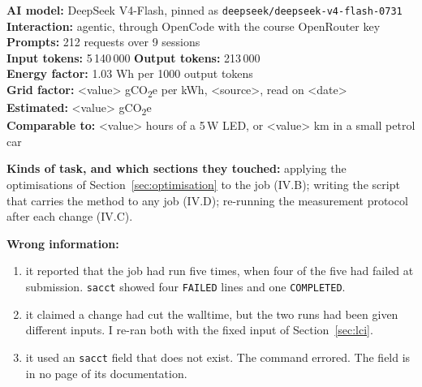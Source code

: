 \documentclass[conference,a4paper]{IEEEtran}
\begin{document}
\medskip
\noindent\textbf{AI model:} DeepSeek V4-Flash, pinned as
\texttt{deepseek/deepseek-v4-flash-0731} \\
\textbf{Interaction:} agentic, through OpenCode with the course OpenRouter key \\
\textbf{Prompts:} 212 requests over 9 sessions \\
\textbf{Input tokens:} 5\,140\,000 \quad \textbf{Output tokens:} 213\,000 \\
\textbf{Energy factor:} 1.03 Wh per 1000 output tokens \\
\textbf{Grid factor:} <value> gCO\textsubscript{2}e per kWh, <source>, read on
<date> \\
\textbf{Estimated:} <value> gCO\textsubscript{2}e \\
\textbf{Comparable to:} <value> hours of a 5\,W LED, or <value> km in a small
petrol car

\textbf{Kinds of task, and which sections they touched:} applying the
optimisations of Section~\ref{sec:optimisation} to the job (IV.B); writing the
script that carries the method to any job (IV.D); re-running the measurement
protocol after each change (IV.C).

\textbf{Wrong information:}
\begin{enumerate}
\item it reported that the job had run five times, when four of the five had
  failed at submission. \texttt{sacct} showed four \texttt{FAILED} lines and one
  \texttt{COMPLETED}.
\item it claimed a change had cut the walltime, but the two runs had been given
  different inputs. I re-ran both with the fixed input of
  Section~\ref{sec:lci}.
\item it used an \texttt{sacct} field that does not exist. The command errored.
  The field is in no page of its documentation.
\end{enumerate}

\fi
\end{document}
